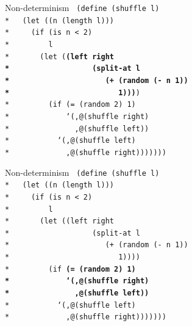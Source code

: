 \documentclass{beamer}
\begin{document}
\begin{frame}{Non-determinism}
  \texttt{
    (define (shuffle l)\\*
    \ \ (let ((n (length l)))\\*
    \ \ \ \ (if (is n < 2)\\*
    \ \ \ \ \ \ \ \ l\\*
    \ \ \ \ \ \ (let (\textbf{(left right\\*
    \ \ \ \ \ \ \ \ \ \ \ \ \ \ \ \ \ \ (split-at l\\*
    \ \ \ \ \ \ \ \ \ \ \ \ \ \ \ \ \ \ \ \ \ (+ (random (- n 1))\\*
    \ \ \ \ \ \ \ \ \ \ \ \ \ \ \ \ \ \ \ \ \ \ \ \ 1)))})\\*
    \ \ \ \ \ \ \ \ (if (= (random 2) 1)\\*
    \ \ \ \ \ \ \ \ \ \ \ \ `(,@(shuffle right)\\*
    \ \ \ \ \ \ \ \ \ \ \ \ \ \ ,@(shuffle left))\\*
    \ \ \ \ \ \ \ \ \ \ `(,@(shuffle left)\\*
    \ \ \ \ \ \ \ \ \ \ \ \ ,@(shuffle right)))))))
    }
\end{frame}


\begin{frame}{Non-determinism}
  \texttt{
    (define (shuffle l)\\*
    \ \ (let ((n (length l)))\\*
    \ \ \ \ (if (is n < 2)\\*
    \ \ \ \ \ \ \ \ l\\*
    \ \ \ \ \ \ (let ((left right\\*
    \ \ \ \ \ \ \ \ \ \ \ \ \ \ \ \ \ \ (split-at l\\*
    \ \ \ \ \ \ \ \ \ \ \ \ \ \ \ \ \ \ \ \ \ (+ (random (- n 1))\\*
    \ \ \ \ \ \ \ \ \ \ \ \ \ \ \ \ \ \ \ \ \ \ \ \ 1))))\\*
    \ \ \ \ \ \ \ \ (if \textbf{(= (random 2) 1)\\*
    \ \ \ \ \ \ \ \ \ \ \ \ `(,@(shuffle right)\\*
    \ \ \ \ \ \ \ \ \ \ \ \ \ \ ,@(shuffle left))}\\*
    \ \ \ \ \ \ \ \ \ \ `(,@(shuffle left)\\*
    \ \ \ \ \ \ \ \ \ \ \ \ ,@(shuffle right)))))))
    }
\end{frame}
\end{document}
